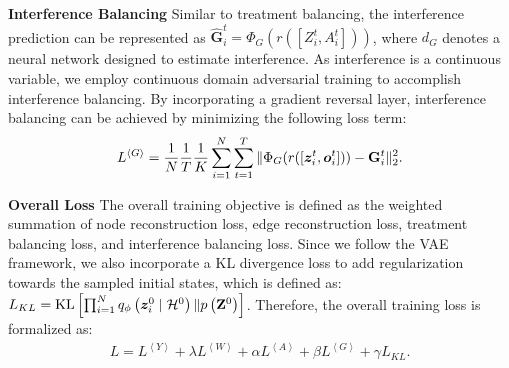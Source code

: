 \textbf{Interference Balancing} Similar to treatment balancing, the interference prediction can be represented as $\hat{\mathbf{G}}_i^t = \Phi_G(r([Z_i^t, A_i^t]))$, where $d_G$ denotes a neural network designed to estimate interference. As interference is a continuous variable, we employ continuous domain adversarial training to accomplish interference balancing. By incorporating a gradient reversal layer, interference balancing can be achieved by minimizing the following loss term:
\begin{align*}
    L^{\left< G\right>} = \frac{1}{N}\frac{1}{T}\frac{1}{K}\sum_{i=1}^N\sum_{t=1}^T \|\Phi_{G}(r([\bm{z}_i^t, \bm{o}_i^t])) - \mathbf{G}_i^t\|_2^2.
\end{align*}

\textbf{Overall Loss} The overall training objective is defined as the weighted summation of node reconstruction loss, edge reconstruction loss, treatment balancing loss, and interference balancing loss. Since we follow the VAE framework, we also incorporate a KL divergence loss to add regularization towards the sampled initial states, which is defined as: $L_{KL} = \mathrm{KL}\left[\prod_{i=1}^N q_\phi\left(\bm{z}_i^0 \mid \mathcal{H}^0\right) \| p\left(\mathbf{Z}^0\right)\right]$.
Therefore, the overall training loss is formalized as:
\begin{align*}
    L = L^{\left< Y \right>} + \lambda L^{\left< W \right>} + \alpha L^{\left< A \right> } + \beta L^{\left< G\right>} + \gamma L_{KL}.
\end{align*}
